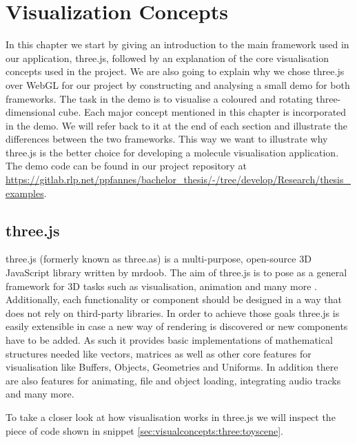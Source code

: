 %

\chapter{Visualization Concepts}
\label{sec:visualconcepts}

In this chapter we start by giving an introduction to the main framework used in our application, three.js, followed by an explanation of the core visualisation concepts used in the project. We are also going to explain why we chose three.js over WebGL for our project by constructing and analysing a small demo for both frameworks. The task in the demo is to visualise a coloured and rotating three-dimensional cube. Each major concept mentioned in this chapter is incorporated in the demo. We will refer back to it at the end of each section and illustrate the differences between the two frameworks. This way we want to illustrate why three.js is the better choice for developing a molecule visualisation application. The demo code can be found in our project repository at \url{https://gitlab.rlp.net/ppfannes/bachelor_thesis/-/tree/develop/Research/thesis_examples}.

\section{three.js}
\label{sec:visualconcepts:three}

three.js (formerly known as three.as) is a multi-purpose, open-source 3D JavaScript library written by mrdoob. The aim of three.js is to pose as a general framework for 3D tasks such as visualisation, animation and many more \cite{mrdoob2022Oct}. Additionally, each functionality or component should be designed in a way that does not rely on third-party libraries. In order to achieve those goals three.js is easily extensible in case a new way of rendering is discovered or new components have to be added. As such it provides basic implementations of mathematical structures needed like vectors, matrices as well as other core features for visualisation like Buffers, Objects, Geometries and Uniforms. In addition there are also features for animating, file and object loading, integrating audio tracks and many more. 

To take a closer look at how visualisation works in three.js we will inspect the piece of code shown in snippet \ref{sec:visualconcepts:three:toyscene}.

